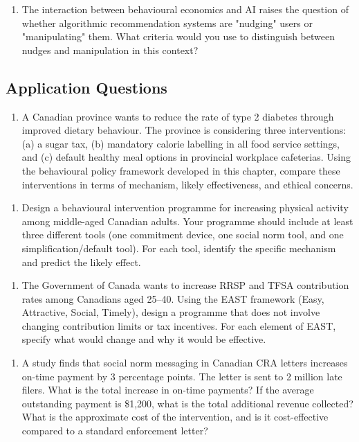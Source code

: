 \documentclass[12pt, letterpaper]{article}
\begin{document}
\begin{enumerate}
\item The interaction between behavioural economics and AI raises the question of whether algorithmic recommendation systems are "nudging" users or "manipulating" them. What criteria would you use to distinguish between nudges and manipulation in this context?
\end{enumerate}


\subsection{Application Questions}


\begin{enumerate}
\item A Canadian province wants to reduce the rate of type 2 diabetes through improved dietary behaviour. The province is considering three interventions: (a) a sugar tax, (b) mandatory calorie labelling in all food service settings, and (c) default healthy meal options in provincial workplace cafeterias. Using the behavioural policy framework developed in this chapter, compare these interventions in terms of mechanism, likely effectiveness, and ethical concerns.
\end{enumerate}

\begin{enumerate}
\item Design a behavioural intervention programme for increasing physical activity among middle-aged Canadian adults. Your programme should include at least three different tools (one commitment device, one social norm tool, and one simplification/default tool). For each tool, identify the specific mechanism and predict the likely effect.
\end{enumerate}

\begin{enumerate}
\item The Government of Canada wants to increase RRSP and TFSA contribution rates among Canadians aged 25--40. Using the EAST framework (Easy, Attractive, Social, Timely), design a programme that does not involve changing contribution limits or tax incentives. For each element of EAST, specify what would change and why it would be effective.
\end{enumerate}

\begin{enumerate}
\item A study finds that social norm messaging in Canadian CRA letters increases on-time payment by 3 percentage points. The letter is sent to 2 million late filers. What is the total increase in on-time payments? If the average outstanding payment is \$1,200, what is the total additional revenue collected? What is the approximate cost of the intervention, and is it cost-effective compared to a standard enforcement letter?
\end{enumerate}
\end{document}
